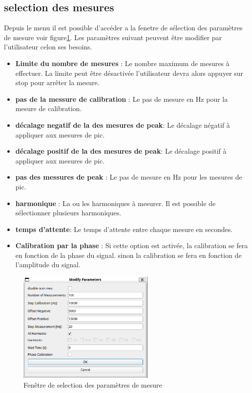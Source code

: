 \subsection{selection des mesures}
Depuis le menu il est possible d'accéder a la fenetre de sélection des paramètres de mesure voir figure\ref{fig:paramerter window}.
Les paramètres suivant peuvent être modifier par l'utilisateur celon ses besoins.
\begin{itemize}
    \item \textbf{Limite du nombre de mesures} : Le nombre maximum de mesures à effectuer. La limite peut être désactivée l'utilisateur devra alors appuyer sur stop pour arrêter la mesure.
    \item \textbf{pas de la messure de calibration} : Le pas de mesure en Hz pour la mesure de calibration.
    \item \textbf{décalage negatif de la des mesures de peak}: Le décalage négatif à appliquer aux mesures de pic.
    \item \textbf{décalage positif de la des mesures de peak}: Le décalage positif à appliquer aux mesures de pic.
    \item \textbf{pas des messures de peak} : Le pas de mesure en Hz pour les mesures de pic.
    \item \textbf{harmonique} : La ou les harmoniques à mesurer. Il est possible de sélectionner plusieurs harmoniques.
    \item \textbf{temps d'attente}: Le temps d'attente entre chaque mesure en secondes.
    \item \textbf{Calibration par la phase} : Si cette option est activée, la calibration se fera en fonction de la phase du signal. sinon la calibration se fera en fonction de l'amplitude du signal.
\end{itemize}

\begin{figure}[H]
    \centering
    \includegraphics[width=0.6\textwidth]{assets/figures/Parameter_window.png}
    \caption{Fenêtre de selection des paramètres de mesure}
    \label{fig:paramerter window}
\end{figure}

